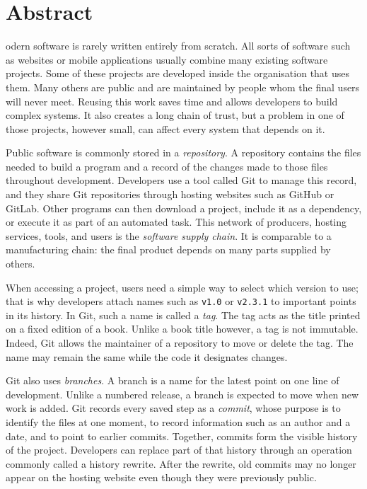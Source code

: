 %

\chapter*{Abstract}
\begin{SingleSpace}
odern software is rarely written entirely from scratch.
All sorts of software such as websites or mobile applications usually combine many existing software projects.
Some of these projects are developed inside the organisation that uses them.
Many others are public and are maintained by people whom the final users will never meet.
Reusing this work saves time and allows developers to build complex systems.
It also creates a long chain of trust, but a problem in one of those projects, however small, can affect every system that depends on it.

Public software is commonly stored in a \emph{repository}.
A repository contains the files needed to build a program and a record of the changes made to those files throughout development.
Developers use a tool called Git to manage this record, and they share Git repositories through hosting websites such as GitHub or GitLab.
Other programs can then download a project, include it as a dependency, or execute it as part of an automated task.
This network of producers, hosting services, tools, and users is the \emph{software supply chain}.
It is comparable to a manufacturing chain: the final product depends on many parts supplied by others.

When accessing a project, users need a simple way to select which version to use; that is why developers attach names such as \texttt{v1.0} or \texttt{v2.3.1} to important points in its history.
In Git, such a name is called a \emph{tag}.
The tag acts as the title printed on a fixed edition of a book.
Unlike a book title however, a tag is not immutable.
Indeed, Git allows the maintainer of a repository to move or delete the tag.
The name may remain the same while the code it designates changes.

Git also uses \emph{branches}.
A branch is a name for the latest point on one line of development.
Unlike a numbered release, a branch is expected to move when new work is added.
Git records every saved step as a \emph{commit}, whose purpose is to identify the files at one moment, to record information such as an author and a date, and to point to earlier commits.
Together, commits form the visible history of the project.
Developers can replace part of that history through an operation commonly called a history rewrite.
After the rewrite, old commits may no longer appear on the hosting website even though they were previously public.


\end{SingleSpace}
